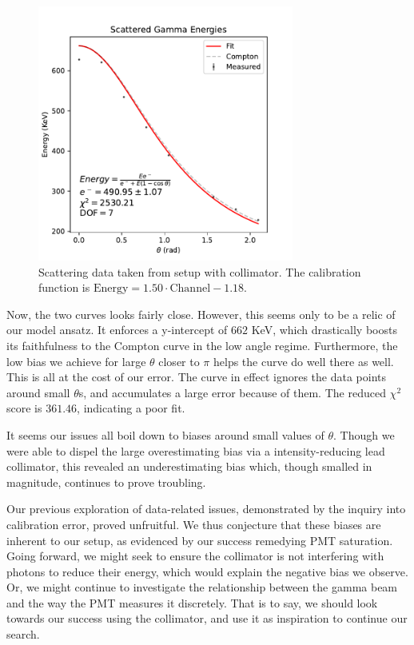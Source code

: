 \documentclass[12pt, letterpaper]{article}
\begin{document}
\begin{figure}[!h]
    \centering
    \includegraphics[width=0.75\textwidth]{experiment2/figures/compton_fit.pdf}
    \caption{Scattering data taken from setup with collimator. The calibration function is $\text{Energy} = 1.50 \cdot \text{Channel}-1.18$. }
    \label{fig:compton-fit}
\end{figure}

Now, the two curves looks fairly close. However, this seems only to be a relic of our model ansatz. It enforces a y-intercept of $662$ KeV, which drastically boosts its faithfulness to the Compton curve in the low angle regime. Furthermore, the low bias we achieve for large $\theta$ closer to $\pi$ helps the curve do well there as well. This is all at the cost of our error. The curve in effect ignores the data points around small $\theta$s, and accumulates a large error because of them. The reduced $\chi^2$ score is $361.46$, indicating a poor fit. 

It seems our issues all boil down to biases around small values of $\theta$. Though we were able to dispel the large overestimating bias via a intensity-reducing lead collimator, this revealed an underestimating bias which, though smalled in magnitude, continues to prove troubling. 

Our previous exploration of data-related issues, demonstrated by the inquiry into calibration error, proved unfruitful. We thus conjecture that these biases are inherent to our setup, as evidenced by our success remedying PMT saturation. Going forward, we might seek to ensure the collimator is not interfering with photons to reduce their energy, which would explain the negative bias we observe. Or, we might continue to investigate the relationship between the gamma beam and the way the PMT measures it discretely. That is to say, we should look towards our success using the collimator, and use it as inspiration to continue our search. 
\end{document}
